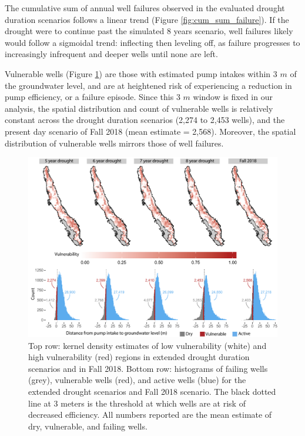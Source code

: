 The cumulative sum of annual well failures observed in the evaluated drought duration scenarios follows a linear trend (Figure \ref{fig:cum_sum_failure}). If the drought were to continue past the simulated 8 years scenario, well failures likely would follow a sigmoidal trend: inflecting then leveling off, as failure progresses to increasingly infrequent and deeper wells until none are left.  

Vulnerable wells (Figure \ref{fig:vi}) are those with estimated pump intakes within 3 $m$ of the groundwater level, and are at heightened risk of experiencing a reduction in pump efficiency, or a failure episode. Since this 3 $m$ window is fixed in our analysis, the spatial distribution and count of vulnerable wells is relatively constant across the drought duration scenarios (2,274 to 2,453 wells), and the present day scenario of Fall 2018 (mean estimate = 2,568). Moreover, the spatial distribution of vulnerable wells mirrors those of well failures.

\begin{figure}
	\includegraphics[width=\textwidth]{ch2_figs/fig_vi.pdf}
	\caption{Top row: kernel density estimates of low vulnerability (white) and high vulnerability (red) regions in extended drought duration scenarios and in Fall 2018. Bottom row: histograms of failing wells (grey), vulnerable wells (red), and active wells (blue) for the extended drought scenarios and Fall 2018 scenario. The black dotted line at 3 meters is the threshold at which wells are at risk of decreased efficiency. All numbers reported are the mean estimate of dry, vulnerable, and failing wells.}
	\label{fig:vi}
\end{figure}



